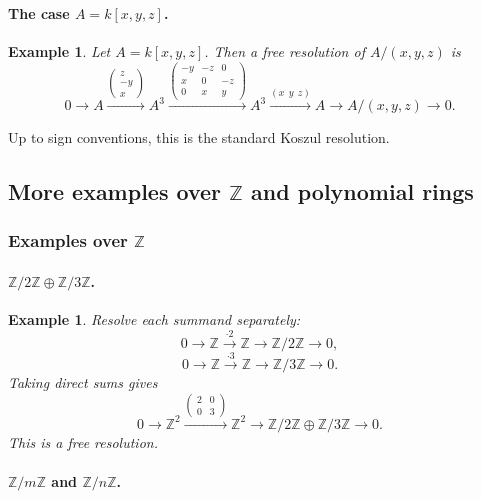 \documentclass[12pt,a4paper]{article}
\theoremstyle{notespace}
\newtheorem{example}[definition]{Example}
\newcommand{\ZZ}{\mathbb{Z}}
\begin{document}
\paragraph{The case \(A=k[x,y,z]\).}

\begin{example}
	Let \(A=k[x,y,z]\). Then a free resolution of \(A/(x,y,z)\) is
	\[
	0\to A \xrightarrow{\begin{pmatrix}z\\-y\\x\end{pmatrix}} A^3
	\xrightarrow{
		\begin{pmatrix}
			-y & -z & 0\\
			x & 0 & -z\\
			0 & x & y
	\end{pmatrix}}
	A^3
	\xrightarrow{(x\ \ y\ \ z)} A
	\to A/(x,y,z)\to 0.
	\]
\end{example}

Up to sign conventions, this is the standard Koszul resolution.

\subsection{More examples over \(\ZZ\) and polynomial rings}

\subsubsection{Examples over \(\ZZ\)}

\paragraph{\(\ZZ/2\ZZ\oplus \ZZ/3\ZZ\).}

\begin{example}
	Resolve each summand separately:
	\[
	0\to \ZZ \xrightarrow{\cdot 2} \ZZ \to \ZZ/2\ZZ \to 0,
	\]
	\[
	0\to \ZZ \xrightarrow{\cdot 3} \ZZ \to \ZZ/3\ZZ \to 0.
	\]
	Taking direct sums gives
	\[
	0\to \ZZ^2 \xrightarrow{
		\begin{pmatrix}
			2 & 0\\
			0 & 3
	\end{pmatrix}}
	\ZZ^2 \to \ZZ/2\ZZ\oplus \ZZ/3\ZZ \to 0.
	\]
	This is a free resolution.
\end{example}

\paragraph{\(\ZZ/m\ZZ\) and \(\ZZ/n\ZZ\).}
\end{document}
